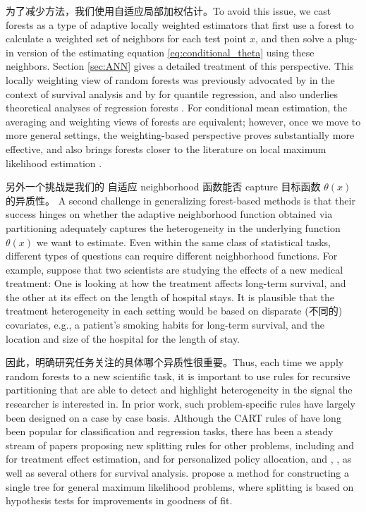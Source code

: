 \documentclass[aos]{imsart}
\theoremstyle{plain}
\theoremstyle{definition}
\theoremstyle{remark}
\begin{document}
\begin{CJK}{UTF8}{gbsn}
为了减少方法，我们使用自适应局部加权估计。To avoid this issue, we cast forests as a type of adaptive locally weighted estimators that
first use a forest to calculate a weighted set of neighbors for each test point $x$, and then
solve a plug-in version of the estimating equation \eqref{eq:conditional_theta} using these neighbors. Section \ref{sec:ANN} gives a detailed treatment of this perspective.
This locally weighting view of random forests was previously advocated by
\citet{hothorn2004bagging} in the context of survival analysis and
by \citet{meinshausen2006quantile} for quantile regression, and also
underlies theoretical analyses of regression forests \citep[e.g.,][]{lin2006random}.
For conditional mean estimation, the averaging and weighting views of forests are equivalent;
however, once we move to more general settings, the weighting-based perspective proves substantially more effective,
and also brings forests closer to the literature on local maximum likelihood estimation
\citep{fan1996local,loader1999local,newey1994kernel,stone1977consistent,tibshirani1987local}.

另外一个挑战是我们的 自适应 neighborhood 函数能否 capture 目标函数 $\theta(x)$ 的异质性。 A second challenge in generalizing forest-based methods is that their success hinges on whether the adaptive
neighborhood function obtained via partitioning adequately captures the
heterogeneity in the underlying function $\theta(x)$ we want to estimate.
Even within the same class of statistical tasks, different types of questions can require different neighborhood functions.
For example, suppose that two scientists are studying the effects
of a new medical treatment: One is looking at how the treatment affects long-term
survival, and the other at its effect on the length of hospital stays.
It is plausible that the treatment heterogeneity in each setting would be based on
disparate (不同的) covariates, e.g., a patient's smoking habits for long-term survival,
and the location and size of the hospital for the length of stay.

因此，明确研究任务关注的具体哪个异质性很重要。Thus, each time we apply random forests to a new scientific task, it is important to use rules for recursive partitioning
that are able to detect and highlight heterogeneity in the signal the researcher is interested in.
In prior work, such problem-specific rules have largely been designed on a case by case basis.
Although the CART rules of \citet{breiman1984classification}
have long been popular for classification and regression tasks, there has been a steady
stream of papers proposing new splitting rules for other problems, including \citet{athey2016recursive}
and \citet{su2009subgroup} for treatment effect estimation, \citet{beygelzimer2009offset}
and \citet{kallus2016learning} for personalized policy allocation, and
\citet{gordon1985tree}, \citet{leblanc1992relative}, \citet{molinaro2004tree} as well as several others
for survival analysis. \citet{zeileis2008model} propose a method
for constructing a single tree for general maximum likelihood problems, where splitting is based on
hypothesis tests for improvements in goodness of fit.


\end{CJK}
\end{document}
